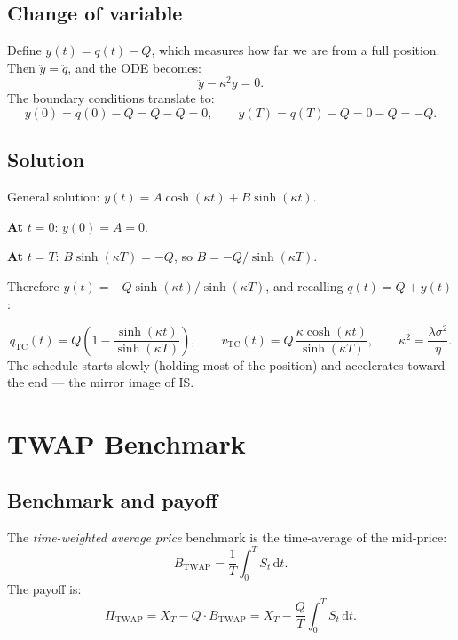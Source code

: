 \documentclass[12pt, a4paper]{article}
\newcommand{\dd}{\,\mathrm{d}}
\newcommand{\kap}{\kappa}
\begin{document}
\subsection{Change of variable}

Define $y(t) = q(t) - Q$, which measures how far we are from a full position.
Then $\ddot y = \ddot q$, and the ODE becomes:
\[
  \ddot y - \kap^2 y = 0.
\]
The boundary conditions translate to:
\[
  y(0) = q(0) - Q = Q - Q = 0, \qquad y(T) = q(T) - Q = 0 - Q = -Q.
\]

\subsection{Solution}

General solution: $y(t) = A\cosh(\kap t) + B\sinh(\kap t)$.

\textbf{At} $t = 0$: $y(0) = A = 0$.

\textbf{At} $t = T$: $B\sinh(\kap T) = -Q$, so $B = -Q/\sinh(\kap T)$.

Therefore $y(t) = -Q\sinh(\kap t)/\sinh(\kap T)$,
and recalling $q(t) = Q + y(t)$:

\begin{resultbox}
\[
  q_{\mathrm{TC}}(t) = Q\!\left(1 - \frac{\sinh(\kap t)}{\sinh(\kap T)}\right),
  \qquad
  v_{\mathrm{TC}}(t) = Q\,\frac{\kap\cosh(\kap t)}{\sinh(\kap T)},
  \qquad \kap^2 = \frac{\lambda\sigma^2}{\eta}.
\]
The schedule starts slowly (holding most of the position)
and accelerates toward the end --- the mirror image of IS.
\end{resultbox}

\section{TWAP Benchmark}
\label{sec:TWAP}

\subsection{Benchmark and payoff}

The \emph{time-weighted average price} benchmark is the time-average of the mid-price:
\[
  B_{\mathrm{TWAP}} = \frac{1}{T}\int_0^T S_t \dd t.
\]
The payoff is:
\[
  \Pi_{\mathrm{TWAP}} = X_T - Q \cdot B_{\mathrm{TWAP}}
  = X_T - \frac{Q}{T}\int_0^T S_t \dd t.
\]
\end{document}
